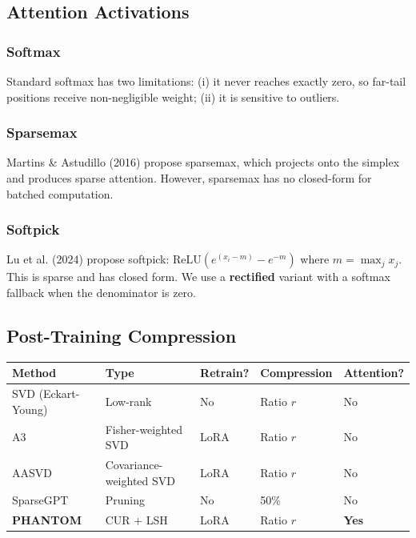 \subsection{Attention Activations}

\subsubsection{Softmax}

Standard softmax has two limitations: (i) it never reaches exactly zero, so 
far-tail positions receive non-negligible weight; (ii) it is sensitive to 
outliers.

\subsubsection{Sparsemax}

Martins \& Astudillo (2016) propose sparsemax, which projects onto the simplex 
and produces sparse attention. However, sparsemax has no closed-form for 
batched computation.

\subsubsection{Softpick}

Lu et al. (2024) propose softpick: $\text{ReLU}(e^{(x_i - m)} - e^{-m})$ 
where $m = \max_j x_j$. This is sparse and has closed form. We use a 
\textbf{rectified} variant with a softmax fallback when the denominator is zero.

\subsection{Post-Training Compression}

\begin{table}[H]
\centering
\small
\begin{tabular}{lllll}
\toprule
\textbf{Method} & \textbf{Type} & \textbf{Retrain?} & \textbf{Compression} & \textbf{Attention?} \\
\midrule
SVD (Eckart-Young) & Low-rank & No & Ratio $r$ & No \\
A3 & Fisher-weighted SVD & LoRA & Ratio $r$ & No \\
AASVD & Covariance-weighted SVD & LoRA & Ratio $r$ & No \\
SparseGPT & Pruning & No & 50\% & No \\
\textbf{PHANTOM} & CUR + LSH & LoRA & Ratio $r$ & \textbf{Yes} \\
\bottomrule
\end{tabular}
\end{table}

